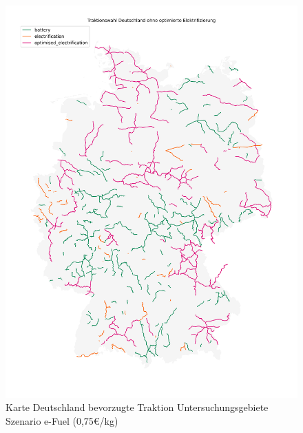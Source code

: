 \begin{center}
	\begin{figure}[p]
	\includegraphics[height=0.8\textheight]{../report_scenarios/s_22/files/deutschland_map}
	\caption{\label{fig_s_22_d_map} Karte Deutschland bevorzugte Traktion Untersuchungsgebiete Szenario e-Fuel (0,75€/kg)}
	\end{figure}
\end{center}

